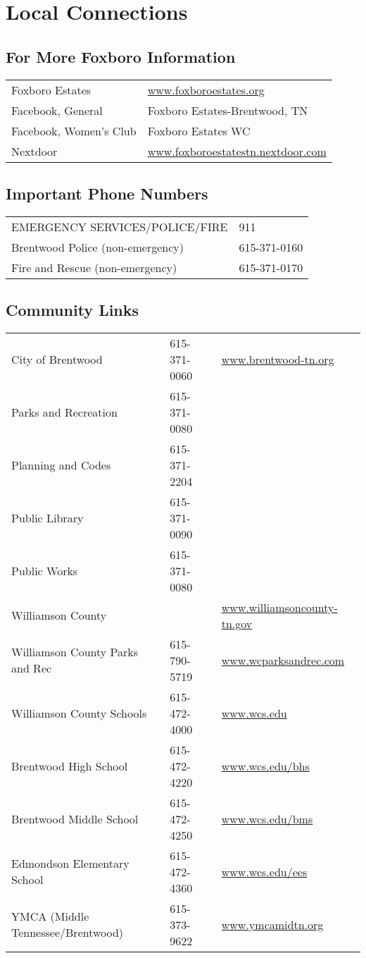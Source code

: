 \section{Local Connections}

\subsection{For More Foxboro Information}

\begin{tabular}{ll}  
Foxboro Estates & \url{www.foxboroestates.org} \\
Facebook, General & Foxboro Estates-Brentwood, TN \\
Facebook, Women’s Club & Foxboro Estates WC \\
Nextdoor & \url{www.foxboroestatestn.nextdoor.com} \\
\end{tabular}


\subsection{Important Phone Numbers}
\begin{tabular}{ll}  
EMERGENCY SERVICES/POLICE/FIRE & 911 \\
Brentwood Police (non-emergency) & 615-371-0160 \\
Fire and Rescue (non-emergency) & 615-371-0170 \\
\end{tabular}

\subsection{Community Links}

\begin{tabular}{lll}
City of Brentwood & 615-371-0060 & \url{www.brentwood-tn.org} \\
Parks and Recreation & 615-371-0080 & \\
Planning and Codes & 615-371-2204 & \\
Public Library & 615-371-0090 & \\
Public Works & 615-371-0080 & \\
Williamson County & & \url{www.williamsoncounty-tn.gov} \\
Williamson County Parks and Rec & 615-790-5719 & \url{www.wcparksandrec.com} \\
Williamson County Schools & 615-472-4000 & \url{www.wcs.edu} \\
Brentwood High School & 615-472-4220 & \url{www.wcs.edu/bhs} \\
Brentwood Middle School & 615-472-4250 & \url{www.wcs.edu/bms} \\
Edmondson Elementary School & 615-472-4360 & \url{www.wcs.edu/ees} \\
YMCA (Middle Tennessee/Brentwood) & 615-373-9622 & \url{www.ymcamidtn.org} \\
\end{tabular}
			
